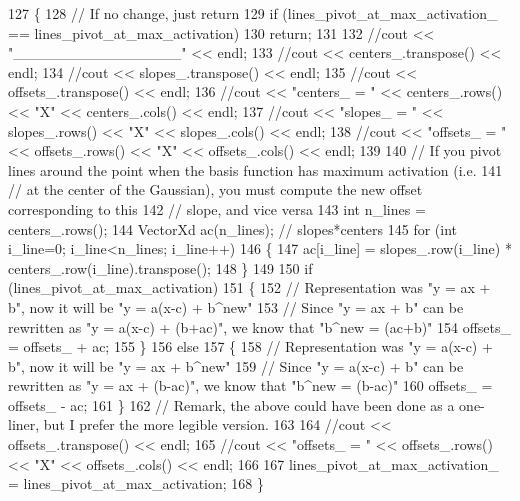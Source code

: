 \begin{DoxyCode}
127 \{
128   \textcolor{comment}{// If no change, just return}
129   \textcolor{keywordflow}{if} (lines\_pivot\_at\_max\_activation\_ == lines\_pivot\_at\_max\_activation)
130     \textcolor{keywordflow}{return};
131 
132   \textcolor{comment}{//cout << "\_\_\_\_\_\_\_\_\_\_\_\_\_\_\_\_" << endl;}
133   \textcolor{comment}{//cout << centers\_.transpose() << endl;  }
134   \textcolor{comment}{//cout << slopes\_.transpose() << endl;  }
135   \textcolor{comment}{//cout << offsets\_.transpose() << endl;  }
136   \textcolor{comment}{//cout << "centers\_ = " << centers\_.rows() << "X" << centers\_.cols() << endl;}
137   \textcolor{comment}{//cout << "slopes\_ = " << slopes\_.rows() << "X" << slopes\_.cols() << endl;}
138   \textcolor{comment}{//cout << "offsets\_ = " << offsets\_.rows() << "X" << offsets\_.cols() << endl;}
139 
140   \textcolor{comment}{// If you pivot lines around the point when the basis function has maximum activation (i.e.}
141   \textcolor{comment}{// at the center of the Gaussian), you must compute the new offset corresponding to this}
142   \textcolor{comment}{// slope, and vice versa    }
143   \textcolor{keywordtype}{int} n\_lines = centers\_.rows();
144   VectorXd ac(n\_lines); \textcolor{comment}{// slopes*centers}
145   \textcolor{keywordflow}{for} (\textcolor{keywordtype}{int} i\_line=0; i\_line<n\_lines; i\_line++)
146   \{
147     ac[i\_line] = slopes\_.row(i\_line) * centers\_.row(i\_line).transpose();
148   \}
149     
150   \textcolor{keywordflow}{if} (lines\_pivot\_at\_max\_activation)
151   \{
152     \textcolor{comment}{// Representation was "y = ax + b", now it will be "y = a(x-c) + b^new" }
153     \textcolor{comment}{// Since "y = ax + b" can be rewritten as "y = a(x-c) + (b+ac)", we know that "b^new = (ac+b)"}
154     offsets\_ = offsets\_ + ac;
155   \}
156   \textcolor{keywordflow}{else}
157   \{
158     \textcolor{comment}{// Representation was "y = a(x-c) + b", now it will be "y = ax + b^new" }
159     \textcolor{comment}{// Since "y = a(x-c) + b" can be rewritten as "y = ax + (b-ac)", we know that "b^new = (b-ac)"}
160     offsets\_ = offsets\_ - ac;
161   \} 
162   \textcolor{comment}{// Remark, the above could have been done as a one-liner, but I prefer the more legible version.}
163   
164   \textcolor{comment}{//cout << offsets\_.transpose() << endl;  }
165   \textcolor{comment}{//cout << "offsets\_ = " << offsets\_.rows() << "X" << offsets\_.cols() << endl;}
166   
167   lines\_pivot\_at\_max\_activation\_ = lines\_pivot\_at\_max\_activation;
168 \}
\end{DoxyCode}
